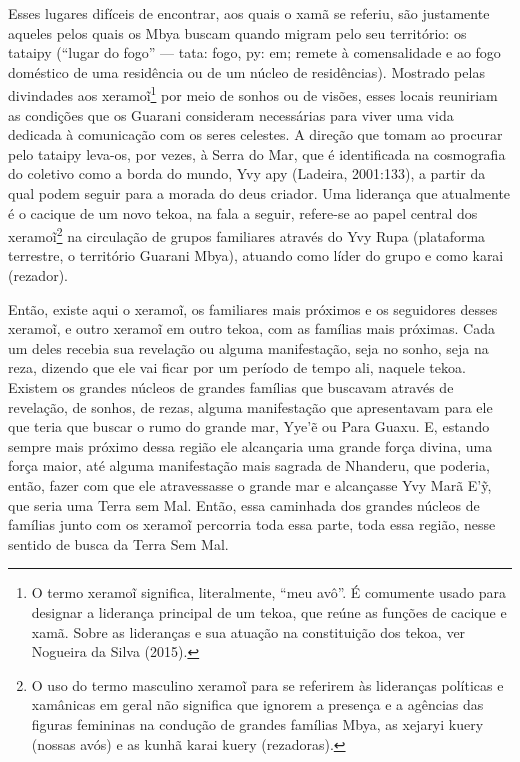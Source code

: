 Esses lugares difíceis de encontrar, aos quais o xamã se referiu, são
justamente aqueles pelos quais os Mbya buscam quando migram pelo seu
território: os tataipy (``lugar do fogo'' — tata: fogo, py: em; remete à
comensalidade e ao fogo doméstico de uma residência ou de um núcleo de
residências). Mostrado pelas divindades aos
xeramo\~{i}\footnote{O termo
xeramo\~{i} significa, literalmente, ``meu avô''. É
comumente usado para designar a liderança principal de um tekoa, que
reúne as funções de cacique e xamã. Sobre as lideranças e sua atuação
na constituição dos tekoa, ver Nogueira da Silva (2015).} por meio de
sonhos ou de visões, esses locais reuniriam as condições que os Guarani
consideram necessárias para viver uma vida dedicada à comunicação com
os seres celestes. A direção que tomam ao procurar pelo tataipy
leva-os, por vezes, à Serra do Mar, que é identificada na cosmografia
do coletivo como a borda do mundo, Yvy apy (Ladeira, 2001:133), a
partir da qual podem seguir para a morada do deus criador. Uma
liderança que atualmente é o cacique de um novo tekoa, na fala a
seguir, refere-se ao papel central dos
xeramo\~{i}\footnote{O uso do termo masculino
xeramo\~{i} para se referirem às lideranças políticas
e xamânicas em geral não significa que ignorem a presença e a agências
das figuras femininas na condução de grandes famílias Mbya, as xejaryi
kuery (nossas avós) e as kunhã karai kuery (rezadoras).} na circulação
de grupos familiares através do Yvy Rupa (plataforma terrestre, o
território Guarani Mbya), atuando como líder do grupo e como karai
(rezador).

Então, existe aqui o xeramo\~{i}, os familiares mais
próximos e os seguidores desses xeramo\~{i}, e outro
xeramo\~{i} em outro tekoa, com as famílias mais
próximas. Cada um deles recebia sua revelação ou alguma manifestação,
seja no sonho, seja na reza, dizendo que ele vai ficar por um período
de tempo ali, naquele tekoa. Existem os grandes núcleos de grandes
famílias que buscavam através de revelação, de sonhos, de rezas, alguma
manifestação que apresentavam para ele que teria que buscar o rumo do
grande mar, Yye’\~{e} ou Para Guaxu. E, estando sempre mais próximo
dessa região ele alcançaria uma grande força divina, uma força maior,
até alguma manifestação mais sagrada de Nhanderu, que poderia, então,
fazer com que ele atravessasse o grande mar e alcançasse Yvy Marã
E’\~{y}, que seria uma Terra sem Mal. Então, essa caminhada dos grandes
núcleos de famílias junto com os xeramo\~{i}
percorria toda essa parte, toda essa região, nesse sentido de busca da
Terra Sem Mal.


